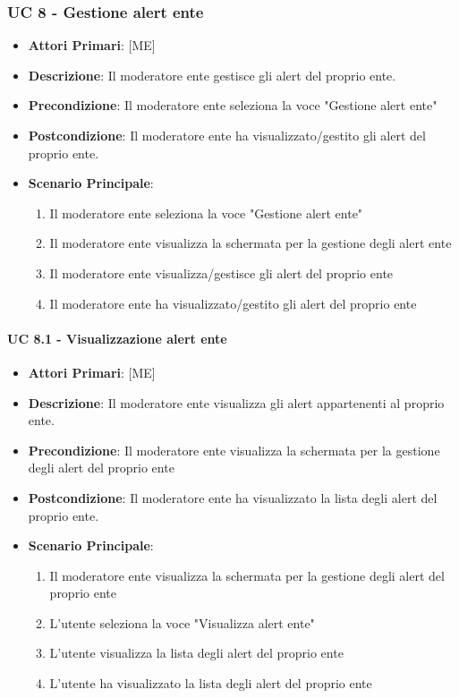 \subsubsection{UC 8 - Gestione alert ente}
		
		
		\begin{itemize}
			\item \textbf{Attori Primari}: [ME]
			\item \textbf{Descrizione}: Il moderatore ente gestisce gli alert del proprio ente.
			\item \textbf{Precondizione}: Il moderatore ente seleziona la voce "Gestione alert ente"
			\item \textbf{Postcondizione}: Il moderatore ente ha visualizzato/gestito gli alert del proprio ente.
			\item \textbf{Scenario Principale}:
			\begin{enumerate}
				\item{Il moderatore ente seleziona la voce "Gestione alert ente"}
				\item{Il moderatore ente visualizza la schermata per la gestione degli alert ente}
				\item{Il moderatore ente visualizza/gestisce gli alert del proprio ente}
				\item{Il moderatore ente ha visualizzato/gestito gli alert del proprio ente}
			\end{enumerate}	
		\end{itemize}
			
			\paragraph{UC 8.1 - Visualizzazione alert ente}
			\begin{itemize}
				\item \textbf{Attori Primari}: [ME]
				\item \textbf{Descrizione}: Il moderatore ente visualizza gli alert appartenenti al proprio ente.
				\item \textbf{Precondizione}: Il moderatore ente visualizza la schermata per la gestione degli alert del proprio ente
				\item \textbf{Postcondizione}: Il moderatore ente ha visualizzato la lista degli alert del proprio ente.
				\item \textbf{Scenario Principale}:
				\begin{enumerate}
					\item{Il moderatore ente visualizza la schermata per la gestione degli alert del proprio ente}
					\item{L'utente seleziona la voce "Visualizza alert ente"}
					\item{L'utente visualizza la lista degli alert del proprio ente}
					\item{L'utente ha visualizzato la lista degli alert del proprio ente}
				\end{enumerate}	
			\end{itemize}
			
